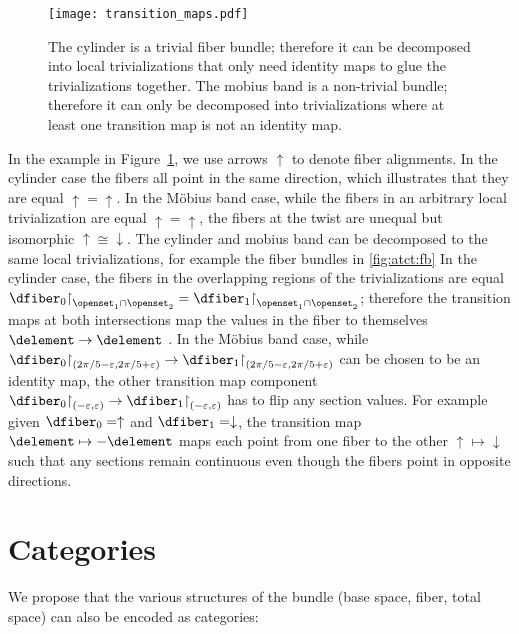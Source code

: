 \documentclass[review]{vgtc}
\theoremstyle{definition}
\theoremstyle{remark}
\renewcommand{\restriction}{\mathord{\upharpoonright}} %
\begin{document}
\begin{figure}[H]
  \texttt{[image: transition\_maps.pdf]}
  \caption{The cylinder is a trivial fiber bundle; therefore it can be decomposed into local trivializations that only need identity
  maps to glue the trivializations together. The mobius band is a non-trivial bundle; therefore it can only be decomposed into trivializations where at least one transition map is not an identity map. }\label{fig:cyl_mob_bundles}
\end{figure}

In the example in Figure~\ref{fig:cyl_mob_bundles}, we use arrows $\uparrow$ to denote fiber alignments. In the cylinder case the fibers all point in the same direction, which illustrates that they are equal $\uparrow=\uparrow$. In the Möbius band case, while the fibers in an arbitrary local trivialization are equal $\uparrow=\uparrow$, the fibers at the twist are unequal but isomorphic $\uparrow \cong \downarrow$. The cylinder and mobius band can be decomposed to the same local trivializations, for example the fiber bundles in \autoref{fig:atct:fb} In the cylinder case, the fibers in the overlapping regions of the trivializations are equal $\dfiber_0\restriction_{\openset_1\cap\openset_2} = \dfiber_{1}\restriction_{\openset_1\cap\openset_2}$; therefore the transition maps at both intersections map the values in the fiber to themselves $\delement\rightarrow\delement$ . In the Möbius band case, while $\dfiber_0\restriction_{(2\pi/5-\varepsilon, 2\pi/5+\varepsilon)}\to\dfiber_1\restriction_{(2\pi/5-\varepsilon, 2\pi/5+\varepsilon)}$ can be chosen to be an identity map, the other transition map component $\dfiber_0\restriction_{(-\varepsilon,\varepsilon)}\to\dfiber_1\restriction_{(-\varepsilon,\varepsilon)}$ has to flip any section values. For example given  $\dfiber_{0}=\uparrow$ and $\dfiber_{1}=\downarrow$, the transition map $\delement \mapsto -\delement$ maps each point from one fiber to the other $\uparrow \mapsto \downarrow$ such that any sections remain continuous even though the fibers point in opposite directions.


\section{Categories}
We propose that the various structures of the bundle (base space, fiber, total space) can also be encoded as categories:
\end{document}
